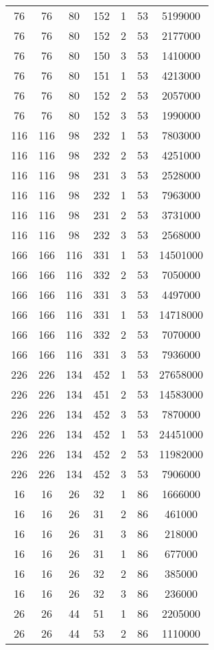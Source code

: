 \documentclass[a4paper,11pt]{article}
\begin{document}
\begin{longtable}{ |c|c|c|p{3cm}|c|c|c| }
76 & 76 & 80 & 152 & 1 & 53 & 5199000 \\
76 & 76 & 80 & 152 & 2 & 53 & 2177000 \\
76 & 76 & 80 & 150 & 3 & 53 & 1410000 \\
76 & 76 & 80 & 151 & 1 & 53 & 4213000 \\
76 & 76 & 80 & 152 & 2 & 53 & 2057000 \\
76 & 76 & 80 & 152 & 3 & 53 & 1990000 \\
116 & 116 & 98 & 232 & 1 & 53 & 7803000 \\
116 & 116 & 98 & 232 & 2 & 53 & 4251000 \\
116 & 116 & 98 & 231 & 3 & 53 & 2528000 \\
116 & 116 & 98 & 232 & 1 & 53 & 7963000 \\
116 & 116 & 98 & 231 & 2 & 53 & 3731000 \\
116 & 116 & 98 & 232 & 3 & 53 & 2568000 \\
166 & 166 & 116 & 331 & 1 & 53 & 14501000 \\
166 & 166 & 116 & 332 & 2 & 53 & 7050000 \\
166 & 166 & 116 & 331 & 3 & 53 & 4497000 \\
166 & 166 & 116 & 331 & 1 & 53 & 14718000 \\
166 & 166 & 116 & 332 & 2 & 53 & 7070000 \\
166 & 166 & 116 & 331 & 3 & 53 & 7936000 \\
226 & 226 & 134 & 452 & 1 & 53 & 27658000 \\
226 & 226 & 134 & 451 & 2 & 53 & 14583000 \\
226 & 226 & 134 & 452 & 3 & 53 & 7870000 \\
226 & 226 & 134 & 452 & 1 & 53 & 24451000 \\
226 & 226 & 134 & 452 & 2 & 53 & 11982000 \\
226 & 226 & 134 & 452 & 3 & 53 & 7906000 \\
16 & 16 & 26 & 32 & 1 & 86 & 1666000 \\
16 & 16 & 26 & 31 & 2 & 86 & 461000 \\
16 & 16 & 26 & 31 & 3 & 86 & 218000 \\
16 & 16 & 26 & 31 & 1 & 86 & 677000 \\
16 & 16 & 26 & 32 & 2 & 86 & 385000 \\
16 & 16 & 26 & 32 & 3 & 86 & 236000 \\
26 & 26 & 44 & 51 & 1 & 86 & 2205000 \\
26 & 26 & 44 & 53 & 2 & 86 & 1110000 \\

\end{longtable}
\end{document}
